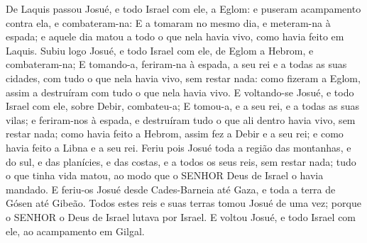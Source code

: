 {De Laquis passou Josué, e todo Israel com ele, a Eglom: e puseram acampamento contra ela, e combateram-na:
E a tomaram no mesmo dia, e meteram-na à espada; e aquele dia matou a todo o que nela havia vivo, como havia feito em Laquis.
Subiu logo Josué, e todo Israel com ele, de Eglom a Hebrom, e combateram-na;
E tomando-a, feriram-na à espada, a seu rei e a todas as suas cidades, com tudo o que nela havia vivo, sem restar nada: como fizeram a Eglom, assim a destruíram com tudo o que nela havia vivo.
E voltando-se Josué, e todo Israel com ele, sobre Debir, combateu-a;
E tomou-a, e a seu rei, e a todas as suas vilas; e feriram-nos à espada, e destruíram tudo o que ali dentro havia vivo, sem restar nada; como havia feito a Hebrom, assim fez a Debir e a seu rei; e como havia feito a Libna e a seu rei.
Feriu pois Josué toda a região das montanhas, e do sul, e das planícies, e das costas, e a todos os seus reis, sem restar nada; tudo o que tinha vida matou, ao modo que o SENHOR Deus de Israel o havia mandado.
E feriu-os Josué desde Cades-Barneia até Gaza, e toda a terra de Gósen até Gibeão.
Todos estes reis e suas terras tomou Josué de uma vez; porque o SENHOR o Deus de Israel lutava por Israel.
E voltou Josué, e todo Israel com ele, ao acampamento em Gilgal.

\par }


